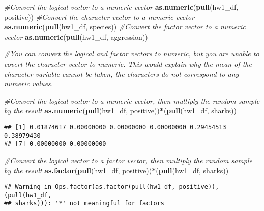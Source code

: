 \documentclass[]{article}
\newenvironment{Shaded}{\begin{snugshade}}{\end{snugshade}}
\newcommand{\CommentTok}[1]{\textcolor[rgb]{0.56,0.35,0.01}{\textit{#1}}}
\newcommand{\KeywordTok}[1]{\textcolor[rgb]{0.13,0.29,0.53}{\textbf{#1}}}
\newcommand{\NormalTok}[1]{#1}
\newcommand{\OperatorTok}[1]{\textcolor[rgb]{0.81,0.36,0.00}{\textbf{#1}}}
\begin{document}
\begin{Shaded}
\begin{Highlighting}[]
\CommentTok{#Convert the logical vector to a numeric vector}
\KeywordTok{as.numeric}\NormalTok{(}\KeywordTok{pull}\NormalTok{(hw1_df, positive))}
\CommentTok{#Convert the character vector to a numeric vector}
\KeywordTok{as.numeric}\NormalTok{(}\KeywordTok{pull}\NormalTok{(hw1_df, species))}
\CommentTok{#Convert the factor vector to a numeric vector}
\KeywordTok{as.numeric}\NormalTok{(}\KeywordTok{pull}\NormalTok{(hw1_df, aggression))}

\CommentTok{#You can convert the logical and factor vectors to numeric, but you are unable to covert the character vector to numeric. This would explain why the mean of the character variable cannot be taken, the characters do not correspond to any numeric values. }
\end{Highlighting}
\end{Shaded}

\begin{Shaded}
\begin{Highlighting}[]
\CommentTok{#Convert the logical vector to a numeric vector, then multiply the random sample by the result}
\KeywordTok{as.numeric}\NormalTok{(}\KeywordTok{pull}\NormalTok{(hw1_df, positive))}\OperatorTok{*}\NormalTok{(}\KeywordTok{pull}\NormalTok{(hw1_df, sharks))}
\end{Highlighting}
\end{Shaded}

\begin{verbatim}
## [1] 0.01874617 0.00000000 0.00000000 0.00000000 0.29454513 0.38979430
## [7] 0.00000000 0.00000000
\end{verbatim}

\begin{Shaded}
\begin{Highlighting}[]
\CommentTok{#Convert the logical vector to a factor vector, then multiply the random sample by the result}
\KeywordTok{as.factor}\NormalTok{(}\KeywordTok{pull}\NormalTok{(hw1_df, positive))}\OperatorTok{*}\NormalTok{(}\KeywordTok{pull}\NormalTok{(hw1_df, sharks))}
\end{Highlighting}
\end{Shaded}

\begin{verbatim}
## Warning in Ops.factor(as.factor(pull(hw1_df, positive)), (pull(hw1_df,
## sharks))): '*' not meaningful for factors
\end{verbatim}
\end{document}
